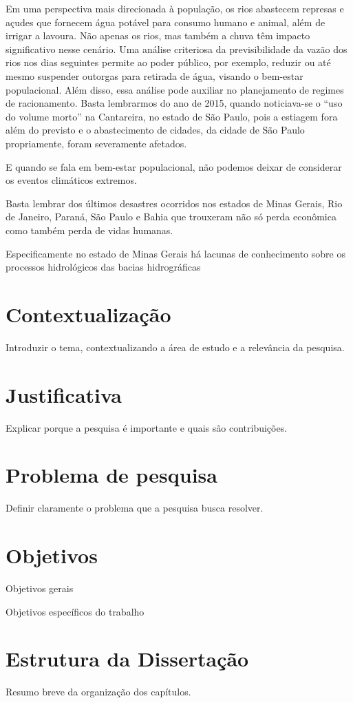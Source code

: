 Em uma perspectiva mais direcionada à população, os rios abastecem represas e açudes que fornecem água potável para consumo humano e animal, além de irrigar a lavoura. Não apenas os rios, mas também a chuva têm impacto significativo nesse cenário. Uma análise criteriosa da previsibilidade da vazão dos rios nos dias seguintes permite ao poder público, por exemplo, reduzir ou até mesmo suspender outorgas para retirada de água, visando o bem-estar populacional. Além disso, essa análise pode auxiliar no planejamento de regimes de racionamento. Basta lembrarmos do ano de 2015, quando noticiava-se o ``uso do volume morto'' na Cantareira, no estado de São Paulo, pois a estiagem fora além do previsto e o abastecimento de cidades, da cidade de São Paulo propriamente, foram severamente afetados.\cite{g1_cantareira_2015}

E quando se fala em bem-estar populacional, não podemos deixar de considerar os eventos climáticos extremos.


Basta lembrar dos últimos desastres ocorridos nos estados de Minas Gerais, Rio de Janeiro, Paraná, São Paulo e Bahia que trouxeram não só perda econômica como também perda de vidas humanas. \cite{bbc_chuvas_bahia_2024} \cite{cnn_temporais_mg_2024} \cite{g1_temporal_es_2024} \cite{g1_temporal_petropolis_2022}

Especificamente no estado de Minas Gerais há lacunas de conhecimento sobre os processos hidrológicos das bacias hidrográficas

\section{Contextualização}
Introduzir o tema, contextualizando a área de estudo e a relevância da pesquisa.

\section{Justificativa}
Explicar porque a pesquisa é importante e quais são contribuições.

\section{Problema de pesquisa}
Definir claramente o problema que a pesquisa busca resolver.

\section{Objetivos}
Objetivos gerais

Objetivos específicos do trabalho

\section{Estrutura da Dissertação}
Resumo breve da organização dos capítulos.